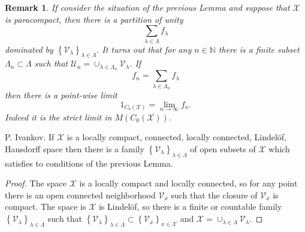 \documentclass{beamer}
\theoremstyle{plain}
\newtheorem{rem}{Remark}
\newcommand{\be}{\begin{equation}}
\newcommand{\ee}{\end{equation}}
\newcommand{\sU}{\mathcal{U}}       %
\newcommand{\sV}{\mathcal{V}}       %
\newcommand{\sX}{\mathcal{X}}       %
\newcommand{\N}{\mathbb{N}}                  %
\newcommand{\la}{\lambda}
\newcommand{\La}{\Lambda}
\begin{document}
\begin{frame}
	
	\begin{rem}\label{fin_comp_lin_empt}
		If consider the situation of the previous Lemma and 	suppose that $\sX$ is paracompact, then  
		there is a partition of unity 
		$$
		\sum_{ \la\in \La}f_\la
		$$
		dominated by  $\left\{\sV_\la \right\}_{\la \in \La}$. It turns out that for any $n \in \N$ there is a finite subset $\La_n \subset \La$ such that $\sU_n = \cup_{\la \in \La_n}\sV_\la$. If 
		\be\label{fin_comp_lin_eqn}
		f_n = \sum_{ \la \in \La_n}f_\la
		\ee
		then there is a point-wise limit
		\be\label{fin_comp_lin_n_eqn}
		1_{C_b\left(\sX \right) } = \lim_{n\to \infty}f_n.
		\ee
		Indeed it is the strict limit in $M\left(C_0\left( \sX\right)  \right)$. 
	\end{rem}
\end{frame}
\begin{frame}
\begin{lemma}\label{fin_comp_linl_lem}
	\alert{P. Ivankov}. 	If  $\sX$ is a locally compact, connected, locally connected,  Lindel\"{o}f,  Hausdorff space  then there is a family $\left\{\sV_\la \right\}_{\la \in \La}$ of open subsets of $\sX$ which satisfies to conditions of the previous Lemma.
\end{lemma}
\begin{proof}
	The space $\sX$ is a locally compact and locally connected, so for any point there is an open connected neighborhood $\sV_x$ such that the closure of $\sV_x$ is compact. The space is $\sX$ is  Lindel\"{o}f, so there is a finite or countable family $\left\{\sV_\la \right\}_{\la \in \La}$  such that $\left\{\sV_\la \right\}_{\la \in \La}\subset \left\{\sV_x \right\}_{x \in \sX}$ and $\sX = \cup_{\la \in \La} \sV_\la$.
\end{proof}
\end{frame}
\end{document}
